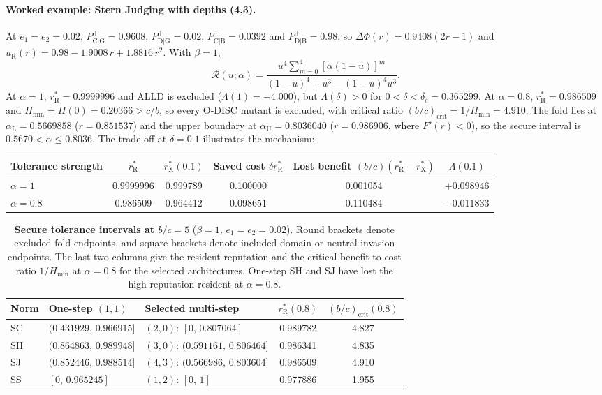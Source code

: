 \documentclass[fleqn,10pt]{wlscirep}
\newcommand{\Rmap}{\mathscr{R}}            %
\newcommand{\Pp}[1]{P^{+}_{\mathrm{#1}}}   %
\newcommand{\rR}{r_{\mathrm{R}}^{*}}
\newcommand{\rX}{r_{\mathrm{X}}^{*}}
\newcommand{\Hmin}{H_{\min}}
\theoremstyle{plain}
\begin{document}
\paragraph{Worked example: Stern Judging with depths (4,3).} At $e_1=e_2=0.02$, $\Pp{C|G}=0.9608$, $\Pp{D|G}=0.02$, $\Pp{C|B}=0.0392$ and $\Pp{D|B}=0.98$, so $\Delta\Phi(r)=0.9408(2r-1)$ and $u_{\mathrm R}(r)=0.98-1.9008\,r+1.8816\,r^2$. With $\beta=1$,
\begin{equation*}
\Rmap(u;\alpha)=\frac{u^4\sum_{m=0}^{4}[\alpha(1-u)]^m}{(1-u)^4+u^3-(1-u)^4u^3}.
\end{equation*}
At $\alpha=1$, $\rR=0.9999996$ and ALLD is excluded ($\Lambda(1)=-4.000$), but $\Lambda(\delta)>0$ for $0<\delta<\delta_c=0.365299$. At $\alpha=0.8$, $\rR=0.986509$ and $\Hmin=H(0)=0.20366>c/b$, so every O-DISC mutant is excluded, with critical ratio $(b/c)_{\mathrm{crit}}=1/\Hmin=4.910$. The fold lies at $\alpha_{\mathrm L}=0.5669858$ ($r=0.851537$) and the upper boundary at $\alpha_{\mathrm U}=0.8036040$ ($r=0.986906$, where $F'(r)<0$), so the secure interval is $0.5670<\alpha\leq0.8036$. The trade-off at $\delta=0.1$ illustrates the mechanism:
\begin{center}
\small
\begin{tabular}{@{}lccccc@{}}
\toprule
Tolerance strength & $\rR$ & $\rX(0.1)$ & Saved cost $\delta\rR$ & Lost benefit $(b/c)(\rR-\rX)$ & $\Lambda(0.1)$\\
\midrule
$\alpha=1$ & 0.9999996 & 0.999789 & 0.100000 & 0.001054 & $+0.098946$\\
$\alpha=0.8$ & 0.986509 & 0.964412 & 0.098651 & 0.110484 & $-0.011833$\\
\bottomrule
\end{tabular}
\end{center}

\begin{table}[!htbp]
\centering
\caption{\textbf{Secure tolerance intervals at $b/c=5$} ($\beta=1$, $e_1=e_2=0.02$). Round brackets denote excluded fold endpoints, and square brackets denote included domain or neutral-invasion endpoints. The last two columns give the resident reputation and the critical benefit-to-cost ratio $1/\Hmin$ at $\alpha=0.8$ for the selected architectures. One-step SH and SJ have lost the high-reputation resident at $\alpha=0.8$.}
\label{tab:si-secure}
\small
\begin{tabular}{@{}lllcc@{}}
\toprule
Norm & One-step $(1,1)$ & Selected multi-step & $\rR(0.8)$ & $(b/c)_{\mathrm{crit}}(0.8)$\\
\midrule
SC & $(0.431929,\,0.966915]$ & $(2,0)$: $[0,\,0.807064]$ & 0.989782 & 4.827\\
SH & $(0.864863,\,0.989948]$ & $(3,0)$: $(0.591161,\,0.806464]$ & 0.986341 & 4.835\\
SJ & $(0.852446,\,0.988514]$ & $(4,3)$: $(0.566986,\,0.803604]$ & 0.986509 & 4.910\\
SS & $[0,\,0.965245]$ & $(1,2)$: $[0,\,1]$ & 0.977886 & 1.955\\
\bottomrule
\end{tabular}
\end{table}
\end{document}
